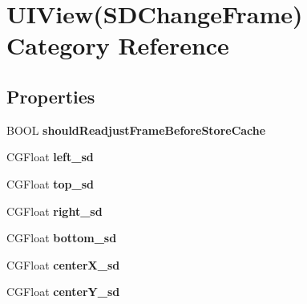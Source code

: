 \hypertarget{category_u_i_view_07_s_d_change_frame_08}{}\section{U\+I\+View(S\+D\+Change\+Frame) Category Reference}
\label{category_u_i_view_07_s_d_change_frame_08}
\subsection*{Properties}
\begin{DoxyCompactItemize}
\item 
\mbox{\label{category_u_i_view_07_s_d_change_frame_08_a8c83bb1abc966b1de26999e055b23ada}} 
B\+O\+OL {\bfseries should\+Readjust\+Frame\+Before\+Store\+Cache}
\item 
\mbox{\label{category_u_i_view_07_s_d_change_frame_08_a05f52b6a289c8b5c187296521e3e12bb}} 
C\+G\+Float {\bfseries left\+\_\+sd}
\item 
\mbox{\label{category_u_i_view_07_s_d_change_frame_08_a39eedaf090677c2e5a889e02d3736e0b}} 
C\+G\+Float {\bfseries top\+\_\+sd}
\item 
\mbox{\label{category_u_i_view_07_s_d_change_frame_08_a2ffe6fba456684ad12e1105c8942183e}} 
C\+G\+Float {\bfseries right\+\_\+sd}
\item 
\mbox{\label{category_u_i_view_07_s_d_change_frame_08_aa3fa63705aef9af6a47347bf871404d5}} 
C\+G\+Float {\bfseries bottom\+\_\+sd}
\item 
\mbox{\label{category_u_i_view_07_s_d_change_frame_08_adff4bad03a99d55734b4f19883b46d0f}} 
C\+G\+Float {\bfseries center\+X\+\_\+sd}
\item 
\mbox{\label{category_u_i_view_07_s_d_change_frame_08_ad67ec32362b63939baf75daa65353084}} 
C\+G\+Float {\bfseries center\+Y\+\_\+sd}
\item 
\mbox{\label{category_u_i_view_07_s_d_change_frame_08_a587c8f7d5cb2faf78fa264ccc9bcfc1b}} 

\end{DoxyCompactItemize}
